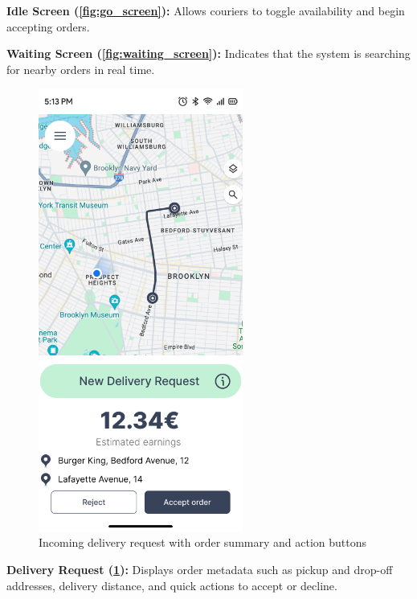 \noindent\textbf{Idle Screen (\ref{fig:go_screen}):}  
Allows couriers to toggle availability and begin accepting orders.

\noindent\textbf{Waiting Screen (\ref{fig:waiting_screen}):}  
Indicates that the system is searching for nearby orders in real time.

\begin{figure}[H]
    \centering
    \includegraphics[width=0.6\textwidth]{images/delivery_request.png}
    \caption{Incoming delivery request with order summary and action buttons}
    \label{fig:delivery_request}
\end{figure}

\noindent\textbf{Delivery Request (\ref{fig:delivery_request}):}  
Displays order metadata such as pickup and drop-off addresses, delivery distance, and quick actions to accept or decline.

